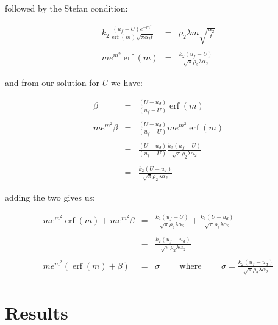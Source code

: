 \documentclass{report}
\DeclareMathOperator{\erf}{erf}
\begin{document}
followed by the Stefan condition:\bigskip

\begin{eqnarray*}
  k_2 \frac{(u_f - U) e^{-m^2}}{\erf (m) \sqrt{\pi \alpha_2 t}} & = & \rho_2 \lambda m \sqrt{\frac{\alpha_2}{t}} \\\\
                                             m e^{m^2} \erf (m) & = & \frac{k_2 (u_f - U)}{ \sqrt{\pi} \rho_2 \lambda \alpha_2 } 
\end{eqnarray*}\medskip

and from our solution for $U$ we have:\bigskip

\begin{eqnarray*}
           \beta & = & \frac{(U - u_d)}{(u_f - U)} \erf (m) \\\\
 m e^{m^2} \beta & = & \frac{(U - u_d)}{(u_f - U)} m e^{m^2} \erf (m) \\\\
                 & = & \frac{(U - u_d)}{(u_f - U)} \frac{k_2 (u_f - U)}{ \sqrt{\pi} \rho_2 \lambda \alpha_2 } \\\\
                 & = & \frac{k_2 (U - u_d)}{ \sqrt{\pi} \rho_2 \lambda \alpha_2 } 
\end{eqnarray*}\medskip

adding the two gives us:\bigskip

\begin{eqnarray*}
 m e^{m^2} \erf (m)  + m e^{m^2} \beta & = & \frac{k_2 (u_f - U)}{ \sqrt{\pi} \rho_2 \lambda \alpha_2 } + \frac{k_2 (U - u_d)}{ \sqrt{\pi} \rho_2 \lambda \alpha_2 }  \\\\
                                       & = & \frac{k_2 (u_f - u_d)}{ \sqrt{\pi} \rho_2 \lambda \alpha_2 } \\\\
        m e^{m^2} (\erf (m)  + \beta ) & = & \sigma  \qquad \text{ where } \qquad \sigma = \frac{k_2 (u_f - u_d)}{ \sqrt{\pi} \rho_2 \lambda \alpha_2 } 
\end{eqnarray*}\medskip










\section{Results}
\end{document}
